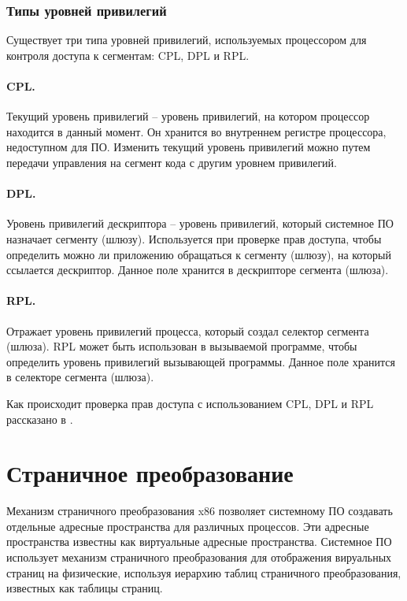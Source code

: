 \subsubsection*{Типы уровней привилегий}
Существует три типа уровней привилегий, используемых процессором для контроля доступа к сегментам: CPL, DPL и RPL.

\paragraph{CPL.} Текущий уровень привилегий -- уровень привилегий, на котором процессор находится в данный
момент. Он хранится во внутреннем регистре процессора, недоступном для ПО. Изменить текущий уровень привилегий
можно путем передачи управления на сегмент кода с другим уровнем привилегий.

\paragraph{DPL.} Уровень привилегий дескриптора -- уровень привилегий, который системное ПО назначает сегменту (шлюзу).
Используется при проверке прав доступа, чтобы определить можно ли приложению обращаться к сегменту (шлюзу), на который
ссылается дескриптор. Данное поле хранится в дескрипторе сегмента (шлюза).

\paragraph{RPL.} Отражает уровень привилегий процесса, который создал селектор сегмента (шлюза). RPL может быть использован
в вызываемой программе, чтобы определить уровень привилегий вызывающей программы. Данное поле хранится
в селекторе сегмента (шлюза).

Как происходит проверка прав доступа с использованием CPL, DPL и RPL рассказано в \cite{amd_pm_v2}.



\section{Страничное преобразование}
Механизм страничного преобразования x86 позволяет системному ПО создавать отдельные адресные
пространства для различных процессов. Эти адресные пространства известны как
виртуальные адресные пространства. Системное ПО использует механизм страничного преобразования
для отображения вируальных страниц на физические, используя иерархию таблиц страничного преобразования,
известных как таблицы страниц.

